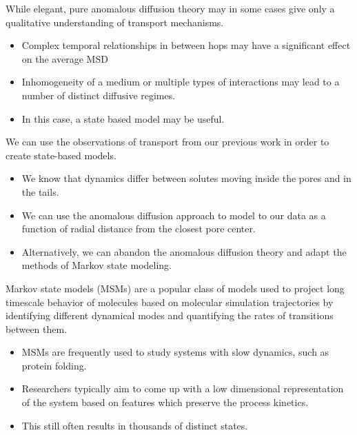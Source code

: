 \documentclass{article}
\begin{document}
  
  While elegant, pure anomalous diffusion theory may in some cases give only a qualitative
  understanding of transport mechanisms.
  \begin{itemize}
    \item Complex temporal relationships in between hops may have a significant effect on the average MSD
    \item Inhomogeneity of a medium or multiple types of interactions may lead to a number of
    distinct diffusive regimes. 
    \item In this case, a state based model may be useful. 
  \end{itemize}
  
  \noindent We can use the observations of transport from our previous work in order to create 
  state-based models.
  \begin{itemize}
  	\item We know that dynamics differ between solutes moving inside the pores and 
  	in the tails.
  	\item We can use the anomalous diffusion approach to model to our data as a 
  	function of radial distance from the closest pore center.
  	\item Alternatively, we can abandon the anomalous diffusion theory and adapt the 
  	methods of Markov state modeling.
  \end{itemize}

  Markov state models (MSMs) are a popular class of models used to project long timescale
  behavior of molecules based on molecular simulation trajectories by identifying
  different dynamical modes and quantifying the rates of transitions between them.
  \begin{itemize}
    \item MSMs are frequently used to study systems with slow dynamics, such as protein 
    folding.~\cite{snow_how_2005,chodera_automatic_2007}
    \item Researchers typically aim to come up with a low dimensional 
    representation of the system based on features which preserve the process
    kinetics.
    \item This still often results in thousands of distinct states. 
  \end{itemize}
  
\end{document}
